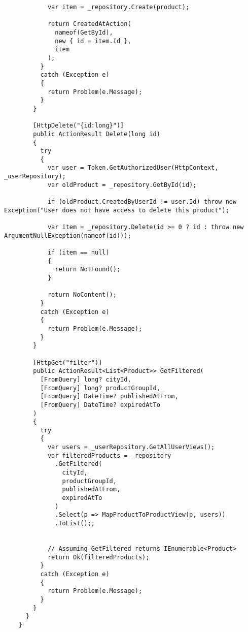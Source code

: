 \begin{lstlisting}
            var item = _repository.Create(product);
    
            return CreatedAtAction(
              nameof(GetById),
              new { id = item.Id },
              item
            );
          }
          catch (Exception e)
          {
            return Problem(e.Message);
          }
        }
    
        [HttpDelete("{id:long}")]
        public ActionResult Delete(long id)
        {
          try
          {
            var user = Token.GetAuthorizedUser(HttpContext, _userRepository);
            var oldProduct = _repository.GetById(id);
    
            if (oldProduct.CreatedByUserId != user.Id) throw new Exception("User does not have access to delete this product");
    
            var item = _repository.Delete(id >= 0 ? id : throw new ArgumentNullException(nameof(id)));
    
            if (item == null)
            {
              return NotFound();
            }
    
            return NoContent();
          }
          catch (Exception e)
          {
            return Problem(e.Message);
          }
        }
    
        [HttpGet("filter")]
        public ActionResult<List<Product>> GetFiltered(
          [FromQuery] long? cityId, 
          [FromQuery] long? productGroupId, 
          [FromQuery] DateTime? publishedAtFrom, 
          [FromQuery] DateTime? expiredAtTo
        )
        {
          try
          {
            var users = _userRepository.GetAllUserViews();
            var filteredProducts = _repository
              .GetFiltered(
                cityId, 
                productGroupId, 
                publishedAtFrom, 
                expiredAtTo
              )
              .Select(p => MapProductToProductView(p, users))
              .ToList();;
            
    
            // Assuming GetFiltered returns IEnumerable<Product>
            return Ok(filteredProducts);
          }
          catch (Exception e)
          {
            return Problem(e.Message);
          }
        }
      }
    }
\end{lstlisting}

